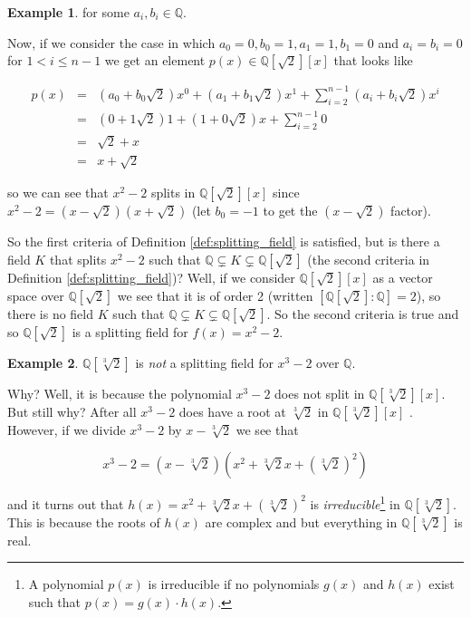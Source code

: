\documentclass[11pt, oneside]{article}   	%
\theoremstyle{definition}
\newtheorem{example}{Example}[section]
\begin{document}
\begin{example}
\bigskip
\noindent
for some $a_i, b_i \in \mathbb{Q}$.

\bigskip
\noindent
Now, if we consider the case in which $a_0 = 0, b_0 = 1, a_1 = 1,
b_1 = 0$ and $a_i = b_i = 0$ for $1 < i \leq n - 1$ we get an
element $p(x) \in \mathbb{Q}[\sqrt{2}][x]$ that looks like

\begin{equation*}
\begin{array}{rlll} 
p(x)   
&=& (a_0 + b_0 \sqrt{2}) x^0 + (a_1 + b_1 \sqrt{2}) x^1 + \sum\limits_{i = 2}^{n-1} (a_i+ b_i \sqrt{2}) x^i \\ 
&=& (0 + 1 \sqrt{2}) 1 + (1 + 0 \sqrt{2}) x + \sum\limits_{i = 2}^{n-1} 0 \\ 
&=& \sqrt{2} + x \\
&=& x + \sqrt{2}   
\end{array}
\end{equation*}

\bigskip
\noindent
so we can see that $x^2 - 2$ splits in $\mathbb{Q}[\sqrt{2}][x]$
since $x^2 -2 = (x - \sqrt{2})(x + \sqrt{2})$ (let $b_0 = -1$ to
get the $(x - \sqrt{2})$ factor).

\bigskip
\noindent
So the first criteria of Definition \ref{def:splitting_field} is
satisfied, but is there a field $K$ that splits $x^2 - 2$ such
that $\mathbb{Q} \subsetneq K \subsetneq \mathbb{Q}[\sqrt{2}]$
(the second criteria in Definition \ref{def:splitting_field})?
Well, if we consider $\mathbb{Q}[\sqrt{2}][x]$ as a vector space
over $\mathbb{Q}[\sqrt{2}]$ we see that it is of order 2 (written
$[\mathbb{Q}[\sqrt{2}]: \mathbb{Q}] = 2$), so there is no field
$K$ such that $\mathbb{Q} \subsetneq K \subsetneq
\mathbb{Q}[\sqrt{2}]$. So the second criteria is true and so
$\mathbb{Q}[\sqrt{2}]$ is a splitting field for $f(x) = x^2 - 2$.
\end{example}



\begin{example}
$\mathbb{Q}[\sqrt[3]{2}]$ is \emph{not} a splitting field for
$x^3 - 2$ over $\mathbb{Q}$.  

\bigskip
\noindent
Why? Well, it is because the polynomial $x^3 - 2$ does not split
in $\mathbb{Q}[\sqrt[3]{2}][x]$. But still why? After all $x^3 -
2$ does have a root at $\sqrt[3]{2}$ in $\mathbb{Q}[\sqrt[3]{2}]
[x]$ . However, if we divide $x^3 - 2$ by $x - \sqrt[3]{2}$ we
see that

\begin{equation}
x^3 - 2 = (x - \sqrt[3]{2})(x^2 + \sqrt[3]{2} x + (\sqrt[3]{2})^2)
\label{eqn:x^3-2}
\end{equation}

\bigskip
\noindent
and it turns out that $h(x) = x^2 + \sqrt[3]{2} x +
(\sqrt[3]{2})^2$ is \emph{irreducible}\footnote{A polynomial
$p(x)$ is irreducible if no polynomials $g(x)$ and $h(x)$ exist
such that $p(x) = g(x) \cdot h(x)$.} in
$\mathbb{Q}[\sqrt[3]{2}]$.  This is because the roots of $h(x)$
are complex and but everything in $\mathbb{Q}[\sqrt[3]{2}]$ is
real.
\end{example}
\end{document}
